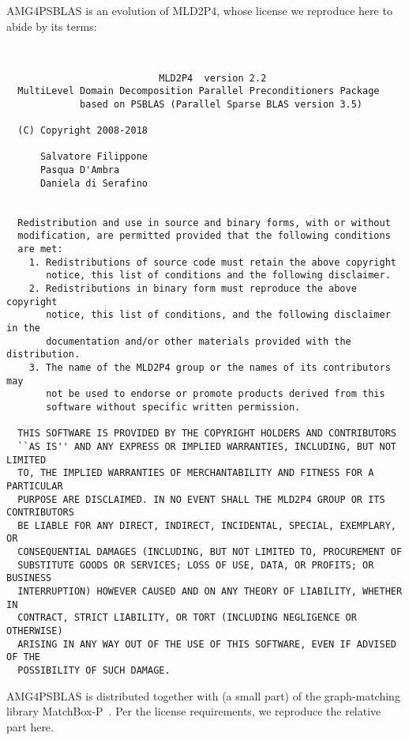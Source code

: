 \newpage
 AMG4PSBLAS is an evolution of MLD2P4, whose license we reproduce here
 to abide by its terms: {\small
\begin{verbatim}


                           MLD2P4  version 2.2
  MultiLevel Domain Decomposition Parallel Preconditioners Package
             based on PSBLAS (Parallel Sparse BLAS version 3.5)

  (C) Copyright 2008-2018

      Salvatore Filippone
      Pasqua D'Ambra
      Daniela di Serafino


  Redistribution and use in source and binary forms, with or without
  modification, are permitted provided that the following conditions
  are met:
    1. Redistributions of source code must retain the above copyright
       notice, this list of conditions and the following disclaimer.
    2. Redistributions in binary form must reproduce the above copyright
       notice, this list of conditions, and the following disclaimer in the
       documentation and/or other materials provided with the distribution.
    3. The name of the MLD2P4 group or the names of its contributors may
       not be used to endorse or promote products derived from this
       software without specific written permission.

  THIS SOFTWARE IS PROVIDED BY THE COPYRIGHT HOLDERS AND CONTRIBUTORS
  ``AS IS'' AND ANY EXPRESS OR IMPLIED WARRANTIES, INCLUDING, BUT NOT LIMITED
  TO, THE IMPLIED WARRANTIES OF MERCHANTABILITY AND FITNESS FOR A PARTICULAR
  PURPOSE ARE DISCLAIMED. IN NO EVENT SHALL THE MLD2P4 GROUP OR ITS CONTRIBUTORS
  BE LIABLE FOR ANY DIRECT, INDIRECT, INCIDENTAL, SPECIAL, EXEMPLARY, OR
  CONSEQUENTIAL DAMAGES (INCLUDING, BUT NOT LIMITED TO, PROCUREMENT OF
  SUBSTITUTE GOODS OR SERVICES; LOSS OF USE, DATA, OR PROFITS; OR BUSINESS
  INTERRUPTION) HOWEVER CAUSED AND ON ANY THEORY OF LIABILITY, WHETHER IN
  CONTRACT, STRICT LIABILITY, OR TORT (INCLUDING NEGLIGENCE OR OTHERWISE)
  ARISING IN ANY WAY OUT OF THE USE OF THIS SOFTWARE, EVEN IF ADVISED OF THE
  POSSIBILITY OF SUCH DAMAGE.

\end{verbatim}
   }
\pagebreak
AMG4PSBLAS is distributed together with (a small part) of the graph-matching
library MatchBox-P~\cite{MatchBoxP}. Per the license requirements, we reproduce
the relative part here.

